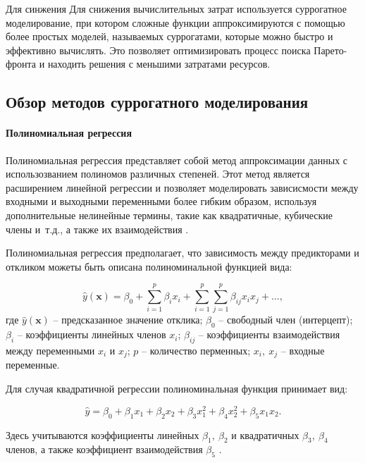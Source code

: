 Для синжения Для снижения вычислительных затрат используется суррогатное моделирование,
при котором сложные функции аппроксимируются с помощью более простых моделей,
называемых суррогатами, которые можно быстро и эффективно вычислять.
Это позволяет оптимизировать процесс поиска Парето-фронта и находить решения
с меньшими затратами ресурсов.



\subsection{Обзор методов суррогатного моделирования}\label{sec:ch4/sec3/subsec1}


\paragraph{Полиномиальная регрессия}\label{sec:ch4/sec3/subsec1/subsubsec1}

Полиномиальная регрессия представляет собой метод аппроксимации данных
с использозванием полиномов различных степеней. Этот метод является расширением линейной
регрессии и позволяет моделировать зависисмости между входными и выходными переменными более
гибким образом, используя дополнительные нелинейные термины, такие как квадратичные, кубические члены
и~т.д., а также их взаимодействия \cite{fan2018local}.

Полиномиальная регрессия предполагает, что зависимость между предикторами и откликом
можеты быть описана полиноминальной функцией вида:

\begin{equation*}
    \hat{y}(\mathbf{x}) = \beta_0 + \sum_{i=1}^{p} \beta_i x_i + \sum_{i=1}^{p} \sum_{j=1}^{p} \beta_{ij} x_i x_j + \ldots,
\end{equation*}
где $\hat{y}(\mathbf{x})$ -- предсказанное значение отклика;
$\beta_0$ -- свободный член (интерцепт);
$\beta_i$ -- коэффициенты линейных членов $x_i$;
$\beta_{ij}$ -- коэффициенты взаимодействия между переменными $x_i$ и $x_j$;
$p$ -- количество перменных;
$x_i,~x_j$ -- входные переменные.

Для случая квадратичной регрессии полиноминальная функция принимает вид:

\begin{equation*}
    \hat{y} = \beta_0 + \beta_1 x_1 + \beta_2 x_2 + \beta_3 x_1^2
    + \beta_4 x_2^2 + \beta_5 x_1 x_2.
\end{equation*}

Здесь учитываются коэффициенты линейных $\beta_1,~\beta_2$ и квадратичных $\beta_3,~\beta_4$ членов,
а также коэффициент взаимодействия $\beta_5$ \cite{heiberger2009polynomial}.

